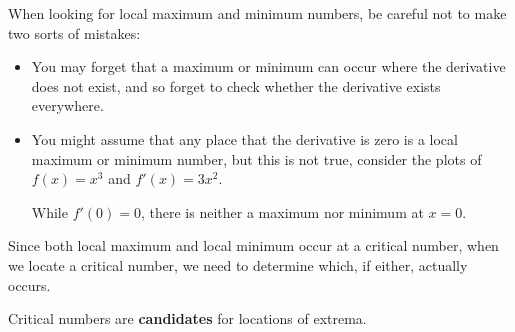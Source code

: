 \documentclass{ximera}
\begin{document}
\begin{warning} 
When looking for local maximum and minimum numbers, be careful not to
make two sorts of mistakes: 
\begin{itemize}
\item You may forget that a maximum or minimum can occur where the
  derivative does not exist, and so forget to check whether the
  derivative exists everywhere. 
\item You might assume that any place that the derivative is zero is a
  local maximum or minimum number, but this is not true, consider the
  plots of $f(x) = x^3$ and $f'(x) = 3x^2$.
\begin{image}
\end{image}
While $f'(0)=0$, there is neither a maximum nor minimum at $x=0$.
\end{itemize}
\end{warning}



Since both local maximum and
local minimum occur at a critical number, when we locate a critical number, we need to determine which, if either,
actually occurs. 


Critical numbers are \textbf{candidates} for locations of extrema.
\end{document}
